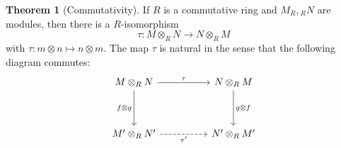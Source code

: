 \documentclass[a4paper,12pt]{article}
\theoremstyle{definition}
\newtheorem{theo}[defn]{Theorem}
\begin{document}
\begin{theo}[Commutativity]
    If $R$ is a commutative ring and $M_R,{ }_R N$ are modules, then there is a $R$-isomorphism
    $$
        \tau: M \otimes_R N \rightarrow N \otimes_{R} M
    $$
    with $\tau: m \otimes n \mapsto n \otimes m$. The map $\tau$ is natural in the sense that the following diagram commutes:
    \begin{equation*}
        \begin{tikzcd}
            {M\otimes_R N} && {N\otimes_R M} \\
            \\
            {M^{\prime}\otimes_R N^{\prime}} && {N^{\prime}\otimes_R M^{\prime}}
            \arrow["{f\otimes g}"', from=1-1, to=3-1]
            \arrow["{\tau^{\prime}}"', dashed, from=3-1, to=3-3]
            \arrow["\tau", from=1-1, to=1-3]
            \arrow["{g\otimes f}", from=1-3, to=3-3]
        \end{tikzcd}
    \end{equation*}
\end{theo}
\end{document}
